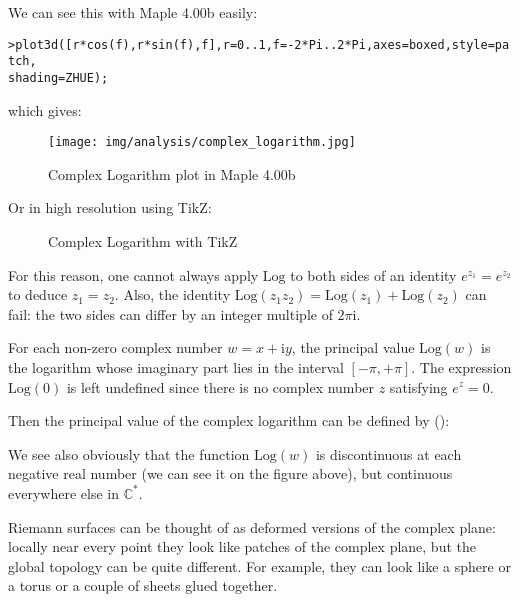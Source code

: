 	We can see this with Maple 4.00b easily:
	
	\texttt{>plot3d([r*cos(f),r*sin(f),f],r=0..1,f=-2*Pi..2*Pi,axes=boxed,style=patch,\\
	shading=ZHUE);}
	
	which gives:
	\begin{figure}[H]
		\centering
		\texttt{[image: img/analysis/complex\_logarithm.jpg]}
		\caption{Complex Logarithm plot in Maple 4.00b}
	\end{figure}
	Or in high resolution using TikZ:
	\begin{figure}[H]
		\centering
		\caption{Complex Logarithm with TikZ}
	\end{figure}
	
	For this reason, one cannot always apply $\text{Log}$ to both sides of an identity $e^{z_1}=e^{z_2}$ to deduce $z_1=z_2$. Also, the identity $\text{Log} (z_1z_2)= \text{Log}(z_1) + \text{Log}(z_2)$ can fail: the two sides can differ by an integer multiple of $2\pi \mathrm{i}$.
	
	For each non-zero complex number $w = x + \mathrm{i}y$, the principal value $\text{Log}(w)$ is the logarithm whose imaginary part lies in the interval $[-\pi,+\pi]$. The expression $\text{Log}(0)$ is left undefined since there is no complex number $z$ satisfying $e^z = 0$.
	
	Then the principal value of the complex logarithm can be defined by ():
	
	We see also obviously that the function $\text{Log}(w)$ is discontinuous at each negative real number (we can see it on the figure above), but continuous everywhere else in $\mathbb{C}^*$.
	
	Riemann surfaces can be thought of as deformed versions of the complex plane: locally near every point they look like patches of the complex plane, but the global topology can be quite different. For example, they can look like a sphere or a torus or a couple of sheets glued together.
	
